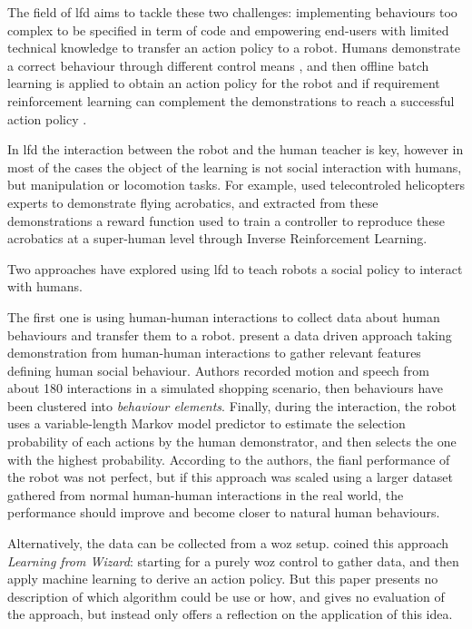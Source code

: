 	The field of \acrfull{lfd} aims to tackle these two challenges: implementing behaviours too complex to be specified in term of code and empowering end-users with limited technical knowledge to transfer an action policy to a robot. Humans demonstrate a correct behaviour through different control means \citep{argall2009survey}, and then offline batch learning is applied to obtain an action policy for the robot and if requirement reinforcement learning can complement the demonstrations to reach a successful action policy \citep{billard2008robot}.
	
	In \gls{lfd} the interaction between the robot and the human teacher is key, however in most of the cases the object of the learning is not social interaction with humans, but manipulation or locomotion tasks. For example, \cite{Abbeel2004} used telecontroled helicopters experts to demonstrate flying acrobatics, and extracted from these demonstrations a reward function used to train a controller to reproduce these acrobatics at a super-human level through Inverse Reinforcement Learning.
	
	Two approaches have explored using \gls{lfd} to teach robots a social policy to interact with humans.
	
	The first one is using human-human interactions to collect data about human behaviours and transfer them to a robot. \citet{liu2014train} present a data driven approach taking demonstration from human-human interactions to gather relevant features defining human social behaviour. Authors recorded motion and speech from about 180 interactions in a simulated shopping scenario, then behaviours have been clustered into \emph{behaviour elements}. Finally, during the interaction, the robot uses a variable-length Markov model predictor to estimate the selection probability of each actions by the human demonstrator, and then selects the one with the highest probability. According to the authors, the fianl performance of the robot was not perfect, but if this approach was scaled using a larger dataset gathered from normal human-human interactions in the real world, the performance should improve and become closer to natural human behaviours.
    
    Alternatively, the data can be collected from a \acrlong{woz} setup. \citep{knox2014learning} coined this approach \emph{Learning from Wizard}: starting for a purely \gls{woz} control to gather data, and then apply machine learning to derive an action policy. But this paper presents no description of which algorithm could be use or how, and gives no evaluation of the approach, but instead only offers a reflection on the application of this idea.
    
